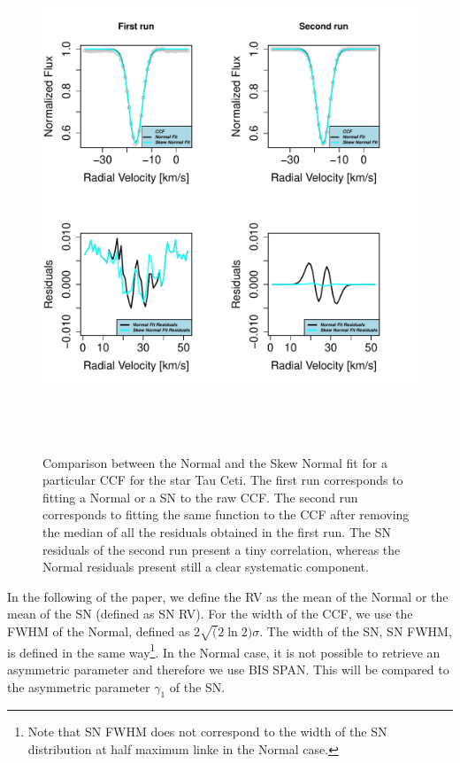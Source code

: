 \documentclass[11pt, oneside]{article}
\begin{document}
\begin{figure}[htbp]
   \centering
\includegraphics[height = 6in]{[1]Plot_Fitting_and_Residuals_2run.pdf} 
   \caption{Comparison between the Normal and the Skew Normal fit for a particular CCF for the star Tau Ceti. The first run corresponds to fitting a Normal or a SN to the raw CCF. The second run corresponds to fitting the same function to the CCF after removing the median of all the residuals obtained in the first run. The SN residuals of the second run present a tiny correlation, whereas the Normal residuals present still a clear systematic component.}
   \label{fig:Residual.comparison}
\end{figure}

In the following of the paper, we define the RV as the mean of the Normal or the mean of the SN (defined as SN RV). For the width of the CCF, we use the FWHM of the Normal, defined as $2\sqrt(2\ln2)\sigma$. The width of the SN, SN FWHM, is defined in the same way\footnote{Note that SN FWHM does not correspond to the width of the SN distribution at half maximum linke in the Normal case.}. In the Normal case, it is not possible to retrieve an asymmetric parameter and therefore we use BIS SPAN. This will be compared to the asymmetric parameter $\gamma_1$ of the SN.
\end{document}

